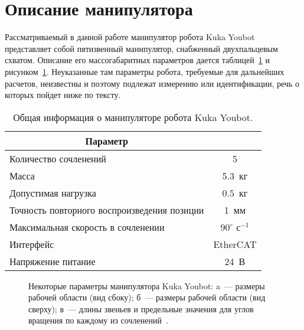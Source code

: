 \section{Описание манипулятора}\label{part_description_of_robot}
Рассматриваемый в данной работе манипулятор робота Kuka Youbot представляет собой пятизвенный манипулятор, снабженный двухпальцевым схватом.
Описание его массогабаритных параметров дается таблицей~\ref{table_gen_info_of_manipulator} и рисунком~\ref{img:sizes_of_robot}.
Неуказанные там параметры робота, требуемые для дальнейших расчетов, неизвестны и поэтому подлежат измерению или идентификации, речь о которых пойдет ниже по тексту.

\begin{table}[h!]
	\caption{Общая информация о манипуляторе робота Kuka Youbot.}
	\begin{center}
		\begin{tabular}{|l|c|}
			\hline
			\multicolumn{1}{|c|}{Параметр} & \makebox[3cm]{Значение}\\
			\hline
			Количество сочленений & 5\\
			\hline
			Масса & 5.3~кг\\
			\hline
			Допустимая нагрузка & $0.5$~кг\\
			\hline
			Точность повторного воспроизведения позиции & 1~мм\\
			\hline
			Максимальная скорость в сочленении & $90^\circ\text{ с}^{-1}$\\
			\hline
			Интерфейс & EtherCAT\\
			\hline
			Напряжение питание & 24~В\\
			\hline
		\end{tabular}
	\end{center}
	\label{table_gen_info_of_manipulator}
\end{table}


\begin{figure}[p]
    \vfill
	\begin{minipage}[h]{0.47\linewidth}
	\end{minipage}
	\hfill
	\begin{minipage}[h]{0.47\linewidth}
	\end{minipage}
	\caption{Некоторые параметры манипулятора Kuka Youbot: a~--- размеры рабочей области (вид сбоку); б~--- размеры рабочей области (вид сверху); в~--- длины звеньев и предельные значения для углов вращения по каждому из сочленений~\cite{youbot_detailed_specifications}.}
	\label{img:sizes_of_robot}
\end{figure}

\newpage